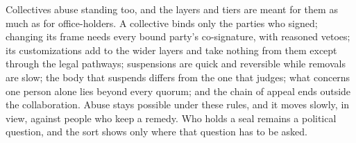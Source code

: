 Collectives abuse standing too, and the layers and tiers are meant for them as much as for
office-holders. A collective binds only the parties who signed; changing its frame needs every bound
party's co-signature, with reasoned vetoes; its customizations add to the wider layers and take
nothing from them except through the legal pathways; suspensions are quick and reversible while
removals are slow; the body that suspends differs from the one that judges; what concerns one person
alone lies beyond every quorum; and the chain of appeal ends outside the collaboration. Abuse stays
possible under these rules, and it moves slowly, in view, against people who keep a remedy. Who
holds a seal remains a political question, and the sort shows only where that question has to be
asked.
